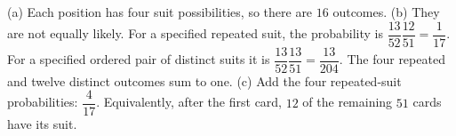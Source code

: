 (a) Each position has four suit possibilities, so there are $\boxed{16}$ outcomes.
(b) They are not equally likely. For a specified repeated suit, the probability is $\dfrac{13}{52}\dfrac{12}{51}=\boxed{\dfrac{1}{17}}$. For a specified ordered pair of distinct suits it is $\dfrac{13}{52}\dfrac{13}{51}=\boxed{\dfrac{13}{204}}$. The four repeated and twelve distinct outcomes sum to one.
(c) Add the four repeated-suit probabilities: $\boxed{\dfrac{4}{17}}$. Equivalently, after the first card, $12$ of the remaining $51$ cards have its suit.
